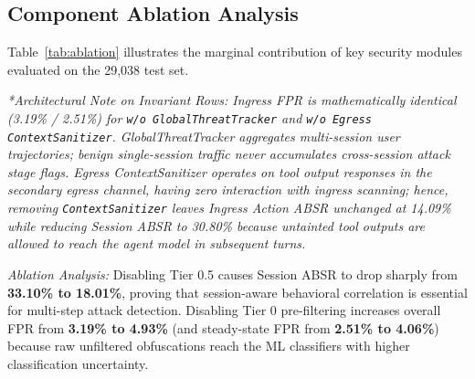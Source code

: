 \documentclass[runningheads]{llncs}
\begin{document}
\subsection{Component Ablation Analysis}
Table~\ref{tab:ablation} illustrates the marginal contribution of key security modules evaluated on the 29,038 test set.

\begin{table}[t]
\caption{Component Ablation Study on the 29,038 Record Benchmark Set}
\label{tab:ablation}
\centering
{}
\end{table}

\textit{*Architectural Note on Invariant Rows: Ingress FPR is mathematically identical (3.19\% / 2.51\%) for \texttt{w/o GlobalThreatTracker} and \texttt{w/o Egress ContextSanitizer}. GlobalThreatTracker aggregates multi-session user trajectories; benign single-session traffic never accumulates cross-session attack stage flags. Egress ContextSanitizer operates on tool output responses in the secondary egress channel, having zero interaction with ingress scanning; hence, removing \texttt{ContextSanitizer} leaves Ingress Action ABSR unchanged at 14.09\% while reducing Session ABSR to 30.80\% because untainted tool outputs are allowed to reach the agent model in subsequent turns.}

\textit{Ablation Analysis:} Disabling Tier 0.5 causes Session ABSR to drop sharply from \textbf{33.10\% to 18.01\%}, proving that session-aware behavioral correlation is essential for multi-step attack detection. Disabling Tier 0 pre-filtering increases overall FPR from \textbf{3.19\% to 4.93\%} (and steady-state FPR from \textbf{2.51\% to 4.06\%}) because raw unfiltered obfuscations reach the ML classifiers with higher classification uncertainty.
\end{document}
